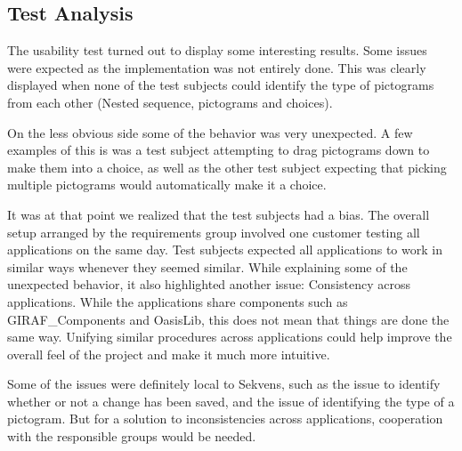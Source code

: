 \subsection{Test Analysis}\label{subsec:test_analysis}
The usability test turned out to display some interesting results. Some issues were expected as the implementation was not entirely done. This was clearly displayed when none of the test subjects could identify the type of pictograms from each other (Nested sequence, pictograms and choices).

On the less obvious side some of the behavior was very unexpected. A few examples of this is was a test subject attempting to drag pictograms down to make them into a choice, as well as the other test subject expecting that picking multiple pictograms would automatically make it a choice.

It was at that point we realized that the test subjects had a bias. The overall setup arranged by the requirements group involved one customer testing all applications on the same day. Test subjects expected all applications to work in similar ways whenever they seemed similar. While explaining some of the unexpected behavior, it also highlighted another issue: Consistency across applications. While the applications share components such as GIRAF\_Components and OasisLib, this does not mean that things are done the same way. Unifying similar procedures across applications could help improve the overall feel of the project and make it much more intuitive.

Some of the issues were definitely local to Sekvens, such as the issue to identify whether or not a change has been saved, and the issue of identifying the type of a pictogram. But for a solution to inconsistencies across applications, cooperation with the responsible groups would be needed.